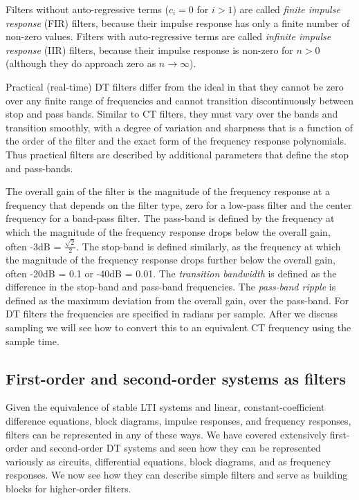 Filters without auto-regressive terms ($c_i = 0$ for $i > 1$) are called \emph{finite impulse response} (FIR) filters, because their impulse response has only a finite number of non-zero values. Filters with auto-regressive terms are called \emph{infinite impulse response} (IIR) filters, because their impulse response is non-zero for $n > 0$ (although they do approach zero as $n\rightarrow \infty$). 

Practical (real-time) DT filters differ from the ideal in that they cannot be zero over any finite range of frequencies and cannot transition discontinuously between stop and pass bands. Similar to CT filters, they must vary over the bands and transition smoothly, with a degree of variation and sharpness that is a function of the order of the filter and the exact form of the frequency response polynomials. Thus practical filters are described by additional parameters that define the stop and pass-bands.

The overall gain of the filter is the magnitude of the frequency response at a frequency that depends on the filter type, zero for a low-pass filter and the center frequency for a band-pass filter. The pass-band is defined by the frequency at which the magnitude of the frequency response drops below the overall gain, often -3dB = $\frac{\sqrt{2}}{2}$. The stop-band is defined similarly, as the frequency at which the magnitude of the frequency response drops further below the overall gain, often -20dB = 0.1 or -40dB = 0.01. The \emph{transition bandwidth} is defined as the difference in the stop-band and pass-band frequencies. The \emph{pass-band ripple} is defined as the maximum deviation from the overall gain, over the pass-band. For DT filters the frequencies are specified in radians per sample. After we discuss sampling we will see how to convert this to an equivalent CT frequency using the sample time.

\subsection{First-order and second-order systems as filters}

Given the equivalence of stable LTI systems and linear, constant-coefficient difference equations, block diagrams, impulse responses, and frequency responses, filters can be represented in any of these ways. We have covered extensively first-order and second-order DT systems and seen how they can be represented variously as circuits, differential equations, block diagrams, and as frequency responses. We now see how they can describe simple filters and serve as building blocks for higher-order filters.

